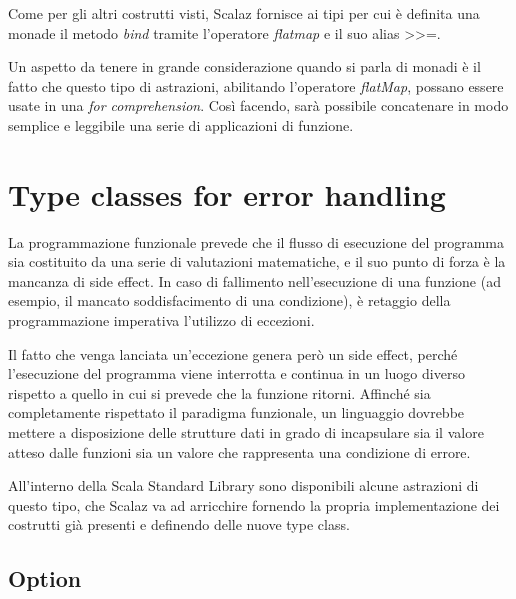 Come per gli altri costrutti visti, Scalaz fornisce ai tipi per cui è definita una monade il metodo \textit{bind} tramite l'operatore \textit{flatmap} e il suo alias >>=.



Un aspetto da tenere in grande considerazione quando si parla di monadi è il fatto che questo tipo di astrazioni, abilitando l'operatore \textit{flatMap}, possano essere usate in una \textit{for comprehension}. Così facendo, sarà possibile concatenare in modo semplice e leggibile una serie di applicazioni di funzione.




\section{Type classes for error handling}

La programmazione funzionale prevede che il flusso di esecuzione del programma sia costituito da una serie di valutazioni matematiche, e il suo punto di forza è la mancanza di side effect. In caso di fallimento nell'esecuzione di una funzione (ad esempio, il mancato soddisfacimento di una condizione), è retaggio della programmazione imperativa l'utilizzo di eccezioni.

Il fatto che venga lanciata un'eccezione genera però un side effect, perché l'esecuzione del programma viene interrotta e continua in un luogo diverso rispetto a quello in cui si prevede che la funzione ritorni. Affinché sia completamente rispettato il paradigma funzionale, un linguaggio dovrebbe mettere a disposizione delle strutture dati in grado di incapsulare sia il valore atteso dalle funzioni sia un valore che rappresenta una condizione di errore.

All'interno della Scala Standard Library sono disponibili alcune astrazioni di questo tipo, che Scalaz va ad arricchire fornendo la propria implementazione dei costrutti già presenti e definendo delle nuove type class.

\subsection{Option}

